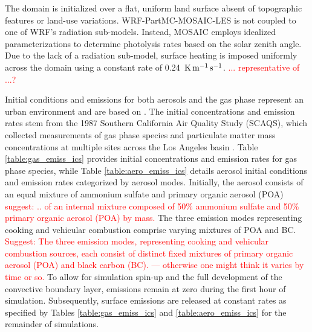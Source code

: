 \documentclass[journal abbreviation, manuscript]{copernicus}
\begin{document}
The domain is initialized over a flat, uniform land surface absent of
topographic features or land-use variations. WRF-PartMC-MOSAIC-LES is
not coupled to one of WRF's radiation sub-models. Instead, MOSAIC
employs idealized parameterizations to determine photolysis rates
based on the solar zenith angle. Due to the lack of a radiation
sub-model, surface heating is imposed uniformly across the domain
using a constant rate of 0.24~$\rm K \, m^{-1} \,
s^{-1}$. \textcolor{red}{... representative of ...?}

Initial conditions and emissions for both aerosols and the gas phase
represent an urban environment and are based on
\citet{riemer_simulating_2009}. The initial concentrations and
emission rates stem from the 1987 Southern California Air Quality
Study (SCAQS), which collected measurements of gas phase species and
particulate matter mass concentrations at multiple sites across the
Los Angeles basin \citep{zaveri_model_2008}. Table
\ref{table:gas_emiss_ics} provides initial concentrations and emission
rates for gas phase species, while Table \ref{table:aero_emiss_ics}
details aerosol initial conditions and emission rates categorized by
aerosol modes. Initially, the aerosol consists of an equal mixture of
ammonium sulfate and primary organic aerosol (POA)
\textcolor{red}{suggest: .. of an internal mixture composed of 50\%
  ammonium sulfate and 50\% primary organic aerosol (POA) by mass.}
The three emission modes representing cooking and vehicular combustion
comprise varying mixtures of POA and BC. \textcolor{red}{Suggest: The
  three emission modes, representing cooking and vehicular combustion
  sources, each consist of distinct fixed mixtures of primary organic
  aerosol (POA) and black carbon (BC). --- otherwise one might think
  it varies by time or so.} To allow for simulation spin-up and the
full development of the convective boundary layer, emissions remain at
zero during the first hour of simulation. Subsequently, surface
emissions are released at constant rates as specified by Tables
\ref{table:gas_emiss_ics} and \ref{table:aero_emiss_ics} for the
remainder of simulations.
\end{document}
